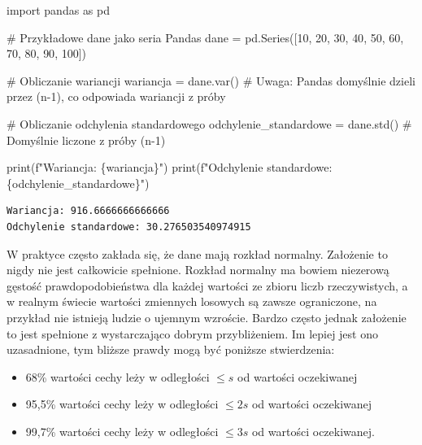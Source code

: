 \documentclass[
  polish,
  letterpaper,
  DIV=11,
  numbers=noendperiod]{scrreprt}
\newenvironment{Shaded}{\begin{snugshade}}{\end{snugshade}}
\newcommand{\BuiltInTok}[1]{\textcolor[rgb]{0.00,0.23,0.31}{#1}}
\newcommand{\CommentTok}[1]{\textcolor[rgb]{0.37,0.37,0.37}{#1}}
\newcommand{\DecValTok}[1]{\textcolor[rgb]{0.68,0.00,0.00}{#1}}
\newcommand{\ImportTok}[1]{\textcolor[rgb]{0.00,0.46,0.62}{#1}}
\newcommand{\NormalTok}[1]{\textcolor[rgb]{0.00,0.23,0.31}{#1}}
\newcommand{\OperatorTok}[1]{\textcolor[rgb]{0.37,0.37,0.37}{#1}}
\newcommand{\SpecialCharTok}[1]{\textcolor[rgb]{0.37,0.37,0.37}{#1}}
\newcommand{\SpecialStringTok}[1]{\textcolor[rgb]{0.13,0.47,0.30}{#1}}
\providecommand{\tightlist}{%
  \setlength{\itemsep}{0pt}\setlength{\parskip}{0pt}}
\begin{document}
\begin{Shaded}
\begin{Highlighting}[]
\ImportTok{import}\NormalTok{ pandas }\ImportTok{as}\NormalTok{ pd}

\CommentTok{\# Przykładowe dane jako seria Pandas}
\NormalTok{dane }\OperatorTok{=}\NormalTok{ pd.Series([}\DecValTok{10}\NormalTok{, }\DecValTok{20}\NormalTok{, }\DecValTok{30}\NormalTok{, }\DecValTok{40}\NormalTok{, }\DecValTok{50}\NormalTok{, }\DecValTok{60}\NormalTok{, }\DecValTok{70}\NormalTok{, }\DecValTok{80}\NormalTok{, }\DecValTok{90}\NormalTok{, }\DecValTok{100}\NormalTok{])}

\CommentTok{\# Obliczanie wariancji}
\NormalTok{wariancja }\OperatorTok{=}\NormalTok{ dane.var()  }\CommentTok{\# Uwaga: Pandas domyślnie dzieli przez (n{-}1), co odpowiada wariancji z próby}

\CommentTok{\# Obliczanie odchylenia standardowego}
\NormalTok{odchylenie\_standardowe }\OperatorTok{=}\NormalTok{ dane.std()  }\CommentTok{\# Domyślnie liczone z próby (n{-}1)}

\BuiltInTok{print}\NormalTok{(}\SpecialStringTok{f"Wariancja: }\SpecialCharTok{\{}\NormalTok{wariancja}\SpecialCharTok{\}}\SpecialStringTok{"}\NormalTok{)}
\BuiltInTok{print}\NormalTok{(}\SpecialStringTok{f"Odchylenie standardowe: }\SpecialCharTok{\{}\NormalTok{odchylenie\_standardowe}\SpecialCharTok{\}}\SpecialStringTok{"}\NormalTok{)}
\end{Highlighting}
\end{Shaded}

\begin{verbatim}
Wariancja: 916.6666666666666
Odchylenie standardowe: 30.276503540974915
\end{verbatim}

W praktyce często zakłada się, że dane mają rozkład normalny. Założenie
to nigdy nie jest całkowicie spełnione. Rozkład normalny ma bowiem
niezerową gęstość prawdopodobieństwa dla każdej wartości ze zbioru liczb
rzeczywistych, a w realnym świecie wartości zmiennych losowych są zawsze
ograniczone, na przykład nie istnieją ludzie o ujemnym wzroście. Bardzo
często jednak założenie to jest spełnione z wystarczająco dobrym
przybliżeniem. Im lepiej jest ono uzasadnione, tym bliższe prawdy mogą
być poniższe stwierdzenia:

\begin{itemize}
\tightlist
\item
  68\% wartości cechy leży w odległości \(\leqslant s\) od wartości
  oczekiwanej
\item
  95,5\% wartości cechy leży w odległości \(\leqslant 2s\) od wartości
  oczekiwanej
\item
  99,7\% wartości cechy leży w odległości \(\leqslant 3s\) od wartości
  oczekiwanej.
\end{itemize}
\end{document}

